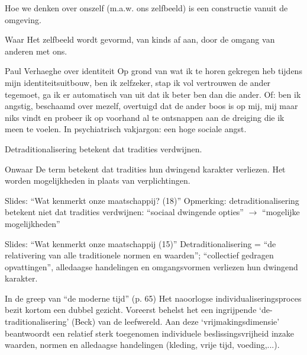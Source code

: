 \documentclass[main.tex]{subfiles}
\begin{document}
\begin{examenvraag}
    \begin{stelling}
        Hoe we denken over onszelf (m.a.w. ons zelfbeeld) is een constructie vanuit de omgeving.
    \end{stelling}

    \begin{stelling-antwoord}{Waar}
        Het zelfbeeld wordt gevormd, van kinds af aan, door de omgang van anderen met ons.
        \begin{citaat}{Paul Verhaeghe over identiteit}
            Op grond van wat ik te horen gekregen heb tijdens mijn identiteitsuitbouw, ben ik zelfzeker, stap ik vol vertrouwen de ander tegemoet, ga ik er automatisch van uit dat ik beter ben dan die ander.
            Of: ben ik angstig, beschaamd over mezelf, overtuigd dat de ander boos is op mij, mij maar niks vindt en probeer ik op voorhand al te ontsnappen aan de dreiging die ik meen te voelen. In psychiatrisch vakjargon: een hoge sociale angst.
        \end{citaat}
    \end{stelling-antwoord}
\end{examenvraag}


\begin{examenvraag}
    \begin{stelling}
        Detraditionalisering betekent dat tradities verdwijnen.
    \end{stelling}

    \begin{stelling-antwoord}{Onwaar}
        De term betekent dat tradities hun dwingend karakter verliezen. Het worden mogelijkheden in plaats van verplichtingen.
        \begin{citaat}{Slides: ``Wat kenmerkt onze maatschappij? (18)''}
            Opmerking: detraditionalisering betekent niet dat tradities verdwijnen: “sociaal dwingende opties” $\rightarrow$ “mogelijke mogelijkheden”
        \end{citaat}
        \begin{citaat}{Slides: ``Wat kenmerkt onze maatschappij (15)''}
            Detraditionalisering = “de relativering van alle traditionele normen en waarden”; “collectief gedragen opvattingen”, alledaagse handelingen en omgangsvormen verliezen hun dwingend karakter.
        \end{citaat}
        \begin{citaat}{In de greep van ``de moderne tijd'' (p. 65)}
            Het naoorlogse individualiseringsproces bezit kortom een dubbel gezicht.
            Voreerst behelst het een ingrijpende `de-traditionalisering' (Beck) van de leefwereld.
            Aan deze `vrijmakingsdimensie' beantwoordt een relatief sterk toegenomen individuele beslissingsvrijheid inzake waarden, normen en alledaagse handelingen (kleding, vrije tijd, voeding,...).
        \end{citaat}
    \end{stelling-antwoord}
\end{examenvraag}
	
\end{document}
